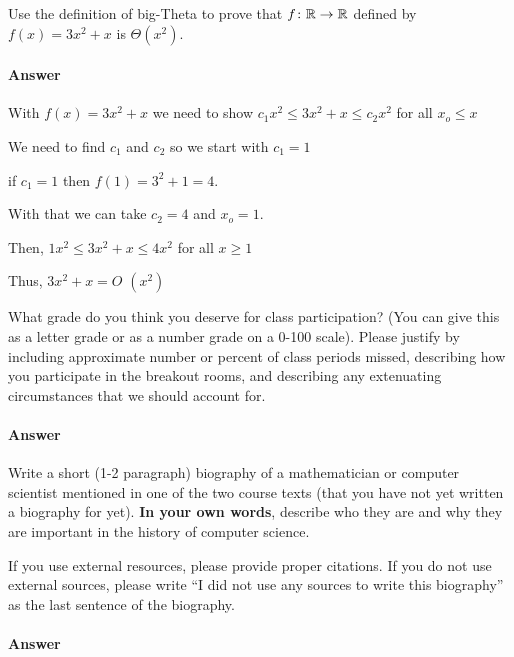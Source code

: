 \documentclass{article}
\begin{document}
\collab{\todo{}} 

Use the definition of big-Theta to prove that $f \colon {\mathbb R} \to {\mathbb R}$ defined by
$f(x) = 3x^2+x$ is $\Theta(x^2)$.

\paragraph{Answer}

With $f(x) = 3x^2+x$ we need to show $c_1 x^2 \leq 3x^2+x \leq c_2 x^2$ for all $x_o \leq x$

We need to find $c_1$ and $c_2$ so we start with $c_1 = 1$

if $c_1 = 1$ then $f(1) = 3^2+1 = 4$.

With that we can take $c_2 = 4$ and $x_o =1$.

Then, $1 x^2 \leq 3x^2+x \leq 4 x^2$ for all $x \geq 1$

Thus, $3x^2+x = O$ $(x^2)$ 


\collab{\todo{}} 

What grade do you think you deserve for class participation? (You can give this
as a letter grade or as a number grade on a 0-100 scale). Please justify by
including approximate number or percent of class periods missed, describing how
you participate in the breakout rooms, and describing any extenuating
circumstances that we should account for.

\paragraph{Answer}



\collab{\todo{}}

Write a short (1-2 paragraph) biography of a mathematician or computer scientist
mentioned in one of the two course texts (that you have not yet written a
biography for yet).
\textbf{In your own words}, describe who they are and why they are important in
the history of computer science.

If you use external resources, please provide
proper citations. If you do not use external sources, please write ``I did not
use any sources to write this biography'' as the last sentence of the
biography.

\paragraph{Answer}


% 
% 
\end{document}
